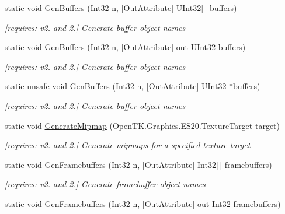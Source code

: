 \begin{DoxyCompactItemize}
static void \hyperlink{class_open_t_k_1_1_graphics_1_1_e_s20_1_1_g_l_a4ae1a71ee1386fea85a8ef1f16a36c92}{Gen\-Buffers} (Int32 n, \mbox{[}Out\-Attribute\mbox{]} U\-Int32\mbox{[}$\,$\mbox{]} buffers)
\begin{DoxyCompactList}\small\item\em \mbox{[}requires\-: v2. and 2.\mbox{]} Generate buffer object names \end{DoxyCompactList}\item 
static void \hyperlink{class_open_t_k_1_1_graphics_1_1_e_s20_1_1_g_l_a9d8e29615bd12c67e9714badc1405795}{Gen\-Buffers} (Int32 n, \mbox{[}Out\-Attribute\mbox{]} out U\-Int32 buffers)
\begin{DoxyCompactList}\small\item\em \mbox{[}requires\-: v2. and 2.\mbox{]} Generate buffer object names \end{DoxyCompactList}\item 
static unsafe void \hyperlink{class_open_t_k_1_1_graphics_1_1_e_s20_1_1_g_l_a7906dd8f777ec6775831fca09638b353}{Gen\-Buffers} (Int32 n, \mbox{[}Out\-Attribute\mbox{]} U\-Int32 $\ast$buffers)
\begin{DoxyCompactList}\small\item\em \mbox{[}requires\-: v2. and 2.\mbox{]} Generate buffer object names \end{DoxyCompactList}\item 
static void \hyperlink{class_open_t_k_1_1_graphics_1_1_e_s20_1_1_g_l_a8e807aeba68580983f25d8477c2653bc}{Generate\-Mipmap} (Open\-T\-K.\-Graphics.\-E\-S20.\-Texture\-Target target)
\begin{DoxyCompactList}\small\item\em \mbox{[}requires\-: v2. and 2.\mbox{]} Generate mipmaps for a specified texture target \end{DoxyCompactList}\item 
static void \hyperlink{class_open_t_k_1_1_graphics_1_1_e_s20_1_1_g_l_a1ee1091d0a961ff495174999516061b1}{Gen\-Framebuffers} (Int32 n, \mbox{[}Out\-Attribute\mbox{]} Int32\mbox{[}$\,$\mbox{]} framebuffers)
\begin{DoxyCompactList}\small\item\em \mbox{[}requires\-: v2. and 2.\mbox{]} Generate framebuffer object names \end{DoxyCompactList}\item 
static void \hyperlink{class_open_t_k_1_1_graphics_1_1_e_s20_1_1_g_l_ab6fcde82d513aff0e2d3d013afa4bc40}{Gen\-Framebuffers} (Int32 n, \mbox{[}Out\-Attribute\mbox{]} out Int32 framebuffers)

\end{DoxyCompactItemize}
